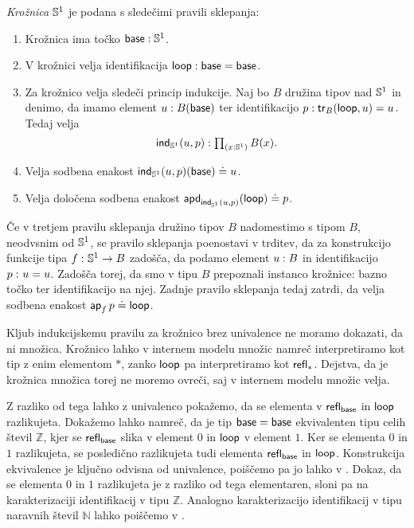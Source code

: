 \begin{definicija}
  \emph{Krožnica} \(\mathbb{S}^{1}\) je podana s sledečimi pravili sklepanja:
  \begin{enumerate}
  \item Krožnica ima točko \(\textnormal{\textsf{base}} : \mathbb{S}^{1}\).
  \item V krožnici velja identifikacija \(\textnormal{\textsf{loop}} : \textnormal{\textsf{base}} = \textnormal{\textsf{base}}\).
  \item Za krožnico velja sledeči princip indukcije. Naj bo \(B\) družina tipov nad \(\mathbb{S}^{1}\) in denimo, da imamo element \(u : B(\textnormal{\textsf{base}})\) ter identifikacijo \(p : \textnormal{\textsf{tr}}_{B}(\textnormal{\textsf{loop}}, u) = u\). Tedaj velja
    \[\textnormal{\textsf{ind}}_{\mathbb{S}^{1}}(u, p) : \textstyle \prod_{\left( x : \mathbb{S}^{1} \right)} B(x).\]
  \item Velja sodbena enakost \(\textnormal{\textsf{ind}}_{\mathbb{S}^{1}}(u, p)(\textnormal{\textsf{base}}) \doteq u\).
  \item Velja določena sodbena enakost \(\textnormal{\textsf{apd}}_{\textnormal{\textsf{ind}}_{\mathbb{S}^{1}}(u, p)}(\textnormal{\textsf{loop}}) \doteq p\).
  \end{enumerate}
\end{definicija}

Če v tretjem pravilu sklepanja družino tipov \(B\) nadomestimo s tipom \(B\), neodvsnim od \(\mathbb{S}^{1}\), se pravilo sklepanja poenostavi v trditev, da za konstrukcijo funkcije tipa \(f \,\colon \mathbb{S}^{1} \to B\) zadošča, da podamo element \(u : B\) in identifikacijo \(p \,\colon u = u\). Zadošča torej, da smo v tipu \(B\) prepoznali instanco krožnice: bazno točko ter identifikacijo na njej. Zadnje pravilo sklepanja tedaj zatrdi, da velja sodbena enakost \(\textnormal{\textsf{ap}}_{f}\, p \doteq \textnormal{\textsf{loop}}\).

\begin{opomba}
Kljub indukcijskemu pravilu za krožnico brez univalence ne moramo dokazati, da ni množica. Krožnico lahko v internem modelu množic namreč interpretiramo kot tip z enim elementom \(\ast\), zanko \(\textnormal{\textsf{loop}}\) pa interpretiramo kot \(\textnormal{\textsf{refl}}_{\ast}\). Dejstva, da je krožnica množica torej ne moremo ovreči, saj v internem modelu množic velja.

Z razliko od tega lahko z univalenco pokažemo, da se elementa v \(\textnormal{\textsf{refl}}_{\textnormal{\textsf{base}}}\) in \(\textnormal{\textsf{loop}}\) razlikujeta. Dokažemo lahko namreč, da je tip \(\textnormal{\textsf{base}} = \textnormal{\textsf{base}}\) ekvivalenten tipu celih števil \(\mathbb{Z}\), kjer se \(\textnormal{\textsf{refl}}_{\textnormal{\textsf{base}}}\) slika v element \(0\) in \(\textnormal{\textsf{loop}}\) v element \(1\). Ker se elementa \(0\) in \(1\) razlikujeta, se posledično razlikujeta tudi elementa \(\textnormal{\textsf{refl}}_{\textnormal{\textsf{base}}}\) in \(\textnormal{\textsf{loop}}\). Konstrukcija ekvivalence je ključno odvisna od univalence, poiščemo pa jo lahko v \cite[Poglavje III.22.4]{rijke2022introduction}. Dokaz, da se elementa \(0\) in \(1\) razlikujeta je z razliko od tega elementaren, sloni pa na karakterizaciji identifikacij v tipu \(\mathbb{Z}\). Analogno karakterizacijo identifikacij v tipu naravnih števil \(\mathbb{N}\) lahko poiščemo v \cite[Poglavje II.11.33]{rijke2022introduction}.
\end{opomba}

